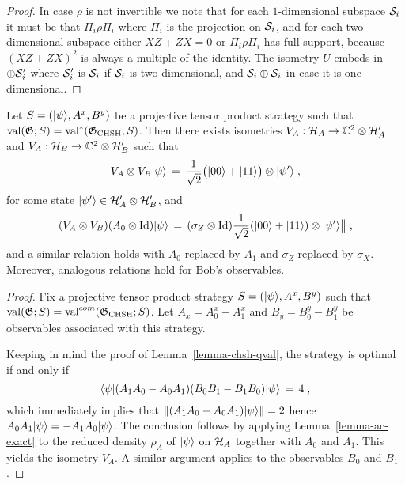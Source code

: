 \begin{proof}
In case $\rho$ is not invertible we note that for each $1$-dimensional subspace $\mathcal{S}_i$ it must be that $\Pi_i \rho \Pi_i$ where $\Pi_i$ is the projection on $\mathcal{S}_i$, and for each two-dimensional subspace either $XZ+ZX=0$ or $\Pi_i \rho \Pi_i$ has full support, because $(XZ+ZX)^2$ is always a multiple of the identity. The isometry $U$ embeds in $\oplus \mathcal{S}'_i$ where $\mathcal{S}'_i$ is $\mathcal{S}_i$ if $\mathcal{S}_i$ is two dimensional, and $\mathcal{S}_i \oplus \mathcal{S}_i$ in case it is one-dimensional.
\end{proof}







\begin{lemma}\label{lemma-rigid-chsh-exact}
Let ${S} = (|\psi\rangle,A^x,B^y)$ be a projective tensor product strategy such that $\mathrm{val}(\mathfrak{G};{S})=\mathrm{val}^*(\mathfrak{G}_{\mathrm{CHSH}};{S})$. Then there exists isometries $V_A:\mathcal{H}_A \to \mathbb{C}^2 \otimes \mathcal{H}'_A$ and $V_A:\mathcal{H}_B \to \mathbb{C}^2 \otimes \mathcal{H}'_B$ such that 
\begin{equation}\label{equation-chsh-state-0}
 V_A \otimes V_B |\psi\rangle \,=\, \frac{1}{\sqrt{2}}\big(|00\rangle+|11\rangle\big) \otimes |\psi'\rangle\;,
\end{equation}
for some state $|\psi'\rangle \in \mathcal{H}'_A \otimes \mathcal{H}'_B$,
and 
\begin{equation}\label{eq:chsh-alice}
( V_A \otimes V_B)( A_0 \otimes \mathop{\rm Id}\nolimits )|\psi\rangle \,=\, (\sigma_Z \otimes \mathop{\rm Id}\nolimits)\frac{1}{\sqrt{2}}(|00\rangle+|11\rangle) \otimes |\psi'\rangle \big\| \;,
\end{equation}
and a similar relation holds with $A_0$ replaced by $A_1$ and $\sigma_Z$ replaced by $\sigma_X$. Moreover, analogous relations hold for Bob's observables. 
\end{lemma}


\begin{proof}
Fix a  projective tensor product strategy ${S} = (|\psi\rangle,A^x,B^y)$ such that $\mathrm{val}(\mathfrak{G};{S})=\mathrm{val}^{com}(\mathfrak{G}_{\mathrm{CHSH}};{S})$. Let $A_x = A^x_0-A^x_1$ and $B_y = B^y_0-B^y_1$ be observables associated with this strategy.

Keeping in mind the proof of Lemma~\ref{lemma-chsh-qval}, the strategy is optimal if and only if 
\[\langle\psi|(A_1A_0-A_0A_1) (B_0B_1-B_1B_0)|\psi\rangle \,=\, 4\;,\]
which immediately implies that $\|(A_1A_0-A_0A_1) |\psi\rangle\|=2$ hence $A_0A_1 |\psi\rangle = - A_1 A_0 |\psi\rangle$. The conclusion follows by applying Lemma~\ref{lemma-ac-exact} to the reduced density $\rho_A$ of $|\psi\rangle$ on $\mathcal{H}_A$ together with $A_0$ and $A_1$. This yields the isometry $V_A$. A similar argument applies to the observables $B_0$ and $B_1$. 
\end{proof}

